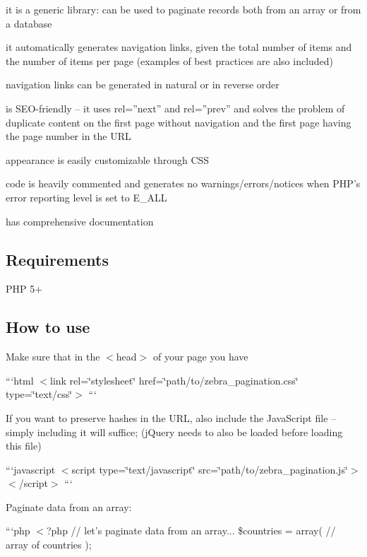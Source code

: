 \begin{DoxyItemize}
\item it is a generic library\-: can be used to paginate records both from an array or from a database
\item it automatically generates navigation links, given the total number of items and the number of items per page (examples of best practices are also included)
\item navigation links can be generated in natural or in reverse order
\item is S\-E\-O-\/friendly – it uses rel=”next” and rel=”prev” and solves the problem of duplicate content on the first page without navigation and the first page having the page number in the U\-R\-L
\item appearance is easily customizable through C\-S\-S
\item code is heavily commented and generates no warnings/errors/notices when P\-H\-P’s error reporting level is set to E\-\_\-\-A\-L\-L
\item has comprehensive documentation
\end{DoxyItemize}

\subsection*{Requirements}

P\-H\-P 5+

\subsection*{How to use}

Make sure that in the $<$head$>$ of your page you have

```html $<$link rel=\char`\"{}stylesheet\char`\"{} href=\char`\"{}path/to/zebra\-\_\-pagination.\-css\char`\"{} type=\char`\"{}text/css\char`\"{}$>$ ```

If you want to preserve hashes in the U\-R\-L, also include the Java\-Script file – simply including it will suffice; (j\-Query needs to also be loaded before loading this file)

```javascript $<$script type=\char`\"{}text/javascript\char`\"{} src=\char`\"{}path/to/zebra\-\_\-pagination.\-js\char`\"{}$>$$<$/script$>$ ```

Paginate data from an array\-:

```php $<$?php // let's paginate data from an array... \$countries = array( // array of countries );

